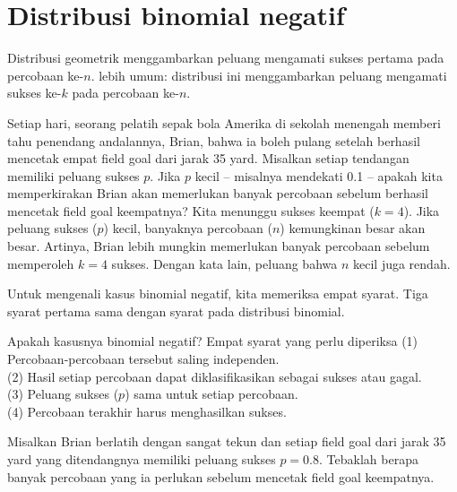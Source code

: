\section{Distribusi binomial negatif}
\label{negativeBinomial}


Distribusi geometrik menggambarkan peluang mengamati sukses pertama pada percobaan ke-$n$.  lebih umum: distribusi ini menggambarkan peluang mengamati sukses ke-$k$ pada percobaan ke-$n$.

\begin{examplewrap}
\begin{nexample}{Setiap hari, seorang pelatih sepak bola Amerika di sekolah menengah memberi tahu penendang andalannya, Brian, bahwa ia boleh pulang setelah berhasil mencetak empat field goal dari jarak 35 yard. Misalkan setiap tendangan memiliki peluang sukses $p$. Jika $p$ kecil -- misalnya mendekati 0.1 -- apakah kita memperkirakan Brian akan memerlukan banyak percobaan sebelum berhasil mencetak field goal keempatnya?}
Kita menunggu sukses keempat ($k=4$). Jika peluang sukses ($p$) kecil, banyaknya percobaan ($n$) kemungkinan besar akan besar. Artinya, Brian lebih mungkin memerlukan banyak percobaan sebelum memperoleh $k=4$ sukses. Dengan kata lain, peluang bahwa $n$ kecil juga rendah.
\end{nexample}
\end{examplewrap}

Untuk mengenali kasus binomial negatif, kita memeriksa empat syarat. Tiga syarat pertama sama dengan syarat pada distribusi binomial.

\begin{onebox}{Apakah kasusnya binomial negatif? Empat syarat yang perlu diperiksa}
(1) Percobaan-percobaan tersebut saling independen. \\
(2) Hasil setiap percobaan dapat diklasifikasikan sebagai sukses atau gagal. \\
(3) Peluang sukses ($p$) sama untuk setiap percobaan. \\
(4) Percobaan terakhir harus menghasilkan sukses.
\end{onebox}

\begin{exercisewrap}
\begin{nexercise}
Misalkan Brian berlatih dengan sangat tekun dan setiap field goal dari jarak 35 yard yang ditendangnya memiliki peluang sukses $p=0.8$. Tebaklah berapa banyak percobaan yang ia perlukan sebelum mencetak field goal keempatnya.\footnotemark
\end{nexercise}
\end{exercisewrap}

